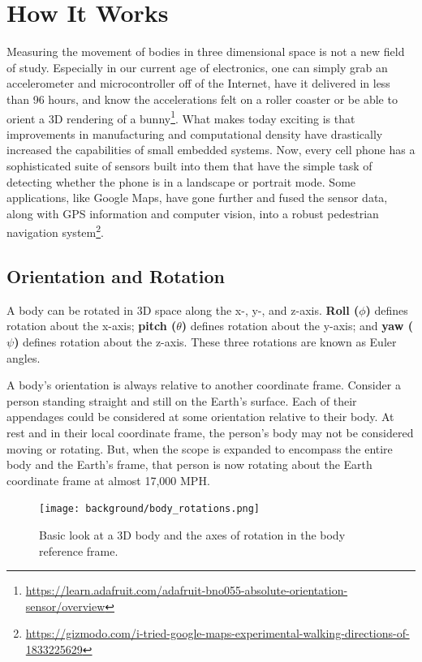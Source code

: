 \chapter{How  It Works} 
Measuring the movement of bodies in three dimensional space is not a new field of study.
Especially in our current age of electronics, one can simply grab an accelerometer and microcontroller off of the Internet, have it delivered in less than 96 hours, and know the accelerations felt on a roller coaster or be able to orient a 3D rendering of a bunny\footnote{\url{https://learn.adafruit.com/adafruit-bno055-absolute-orientation-sensor/overview}}.
What makes today exciting is that improvements in manufacturing and computational density have drastically increased the capabilities of small embedded systems.
Now, every cell phone has a sophisticated suite of sensors built into them that have the simple task of detecting whether the phone is in a landscape or portrait mode. 
Some applications, like Google Maps, have gone further and fused the sensor data, along with GPS information and computer vision, into a robust pedestrian navigation system\footnote{\url{https://gizmodo.com/i-tried-google-maps-experimental-walking-directions-of-1833225629}}.

\section{Orientation and Rotation} 
A body can be rotated in 3D space along the x-, y-, and z-axis.
\textbf{Roll ($\phi$)} defines rotation about the x-axis; \textbf{pitch ($\theta$)} defines rotation about the y-axis; and \textbf{yaw ($\psi$)} defines rotation about the z-axis.
These three rotations are known as Euler angles.

A body's orientation is always relative to another coordinate frame.
Consider a person standing straight and still on the Earth's surface.
Each of their appendages could be considered at some orientation relative to their body.
At rest and in their local coordinate frame, the person's body may not be considered moving or rotating.
But, when the scope is expanded to encompass the entire body and the Earth's frame, that person is now rotating about the Earth coordinate frame at almost 17,000 MPH.

\begin{figure}[h!]
    \caption[Body rotations]{Basic look at a 3D body and the axes of rotation in the body reference frame.}
    \centering
    \texttt{[image: background/body\_rotations.png]}
\end{figure}

